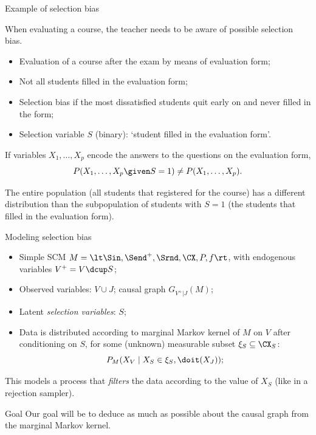 \begin{frame}{Example of selection bias}
\begin{Eg}
  When evaluating a course, the teacher needs to be aware of possible selection bias.
  \begin{itemize}
    \item Evaluation of a course after the exam by means of evaluation form;
    \item Not all students filled in the evaluation form;
    \item Selection bias if the most dissatisfied students quit early on and never filled in the form;
    \item Selection variable $S$ (binary): `student filled in the evaluation form'.
  \end{itemize}
  If variables $X_1,\dots,X_p$ encode the answers to the questions on the evaluation form,
  $$P(X_1,\dots,X_p \given S=1) \ne P(X_1,\dots,X_p).$$

  The entire population (all students that registered for the course) has a different distribution than the subpopulation of students with $S=1$ (the students that filled in the evaluation form).
\end{Eg}
\end{frame}

\begin{frame}{Modeling selection bias}
\begin{Not}
  \begin{itemize}
    \item Simple SCM $M = \lt \Sin, \Send^+, \Srnd, \CX, P, f \rt$, with endogenous variables $V^+ = V \dcup S$;
    \item Observed variables: $V \cup J$; causal graph $G_{V^+|J}(M)$;
    \item Latent \emph{selection variables}: $S$;
    \item Data is distributed according to marginal Markov kernel of $M$ on $V$ after conditioning on $S$,
     for some (unknown) measurable subset $\xi_S \subseteq \CX_S$:
      $$P_M(X_V \mid X_S \in \xi_S, \doit(X_J));$$
  \end{itemize}
  This models a process that \emph{filters} the data according to the value of $X_S$ (like in a rejection sampler).
\end{Not}
\begin{block}{Goal}
Our goal will be to deduce as much as possible about the causal graph from the marginal Markov kernel. 
\end{block}
\end{frame}


